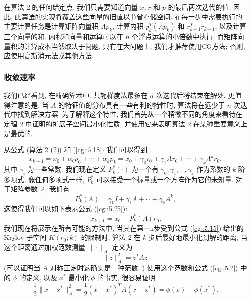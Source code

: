 \documentclass[a4paper]{ctexart}
\begin{document}
{在算法 2 的任何给定点, 我们只需要知道向量 $x$, $r$ 和 $p$ 的最后两次迭代的值. 
因此, 此算法的实现将覆盖这些向量的旧值以节省存储空间. 
在每一步中需要执行的主要计算任务是计算矩阵向量积 $Ap_k$, 
计算内积 $p_k^T(Ap_k)$ 和 $r_{k+1}^Tr_{k+1}$, 以及计算三个向量的和. 
内积和向量和运算可以在 $n$ 个浮点运算的小倍数中执行, 
而矩阵向量积的计算成本当然取决于问题. 只有在大问题上, 我们才推荐使用CG方法; 
否则, 应使用高斯消元法或其他方法. 

\subsubsection*{收敛速率}

我们已经看到, 在精确算术中, 共轭梯度法最多在 $n$ 次迭代后将结束在解处. 
更值得注意的是, 当 $A$ 的特征值的分布具有一些有利的特性时, 
算法将在远少于 $n$ 次迭代中找到解决方案. 为了解释这个特性, 
我们首先从一个稍微不同的角度来看待在定理 2 中证明的扩展子空间最小化性质, 
并使用它来表明算法 2 在某种重要意义上是最优的.

从公式 (算法 2 (2)) 和 (\ref{cg::5.18}) 我们可以得到
\begin{equation}
x_{k+1} = x_0 + \alpha_0p_0 + \cdots + \alpha_kp_k 
= x_0 + \gamma_0r_0 + \gamma_1Ar_0 + \cdots + \gamma_kA^kr_0, 
\label{cg::5.25}
\end{equation}
其中 $\gamma_i$ 为一些常数. 我们现在定义 $P_k^*(\cdot)$ 为一个有 
$\gamma_0, \gamma_1, \cdots, \gamma_k$ 作为系数的 $k$ 阶多项式. 
像任何多项式一样, $P_k^*$ 可以接受一个标量或一个方阵作为它的未知量. 
对于矩阵参数 $A$, 我们有
$$
P_k^*(A) = \gamma_0I + \gamma_1A + \cdots + \gamma_kA^k,
$$
这使得我们可以如下表示公式 (\ref{cg::5.25}):
\begin{equation}
  x_{k+1} = x_0 + P_k^*(A)r_0. \label{cg::5.26}
\end{equation}
我们现在将展示在所有可能的方法中, 
当其在第一k步受到公式 (\ref{cg::5.15}) 给出的 Krylov 子空间
$K(r_0; k)$ 的限制时, 算法 2 在 $k$ 步后最好地最小化到解的距离, 
当这个距离通过加权范数测量 $\| \cdot \|_A$ 定义为
\begin{equation}
\|z\|_A^2 = z^TAz. 
\label{cg::5.27}
\end{equation}
(可以证明当 $A$ 对称正定时这确实是一种范数. )
使用这个范数和公式 (\ref{cg::5.2}) 中的 $\phi$ 的定义, 
以及 $x^*$ 最小化 $\phi$ 的事实, 很容易证明
\begin{equation}
  \frac{1}{2}\|x - x^*\|_A^2 = \frac{1}{2}(x - x^*)^T A(x - x^*) = \phi(x) - \phi(x^*).
  \label{cg::5.28}
\end{equation}

}
\end{document}
